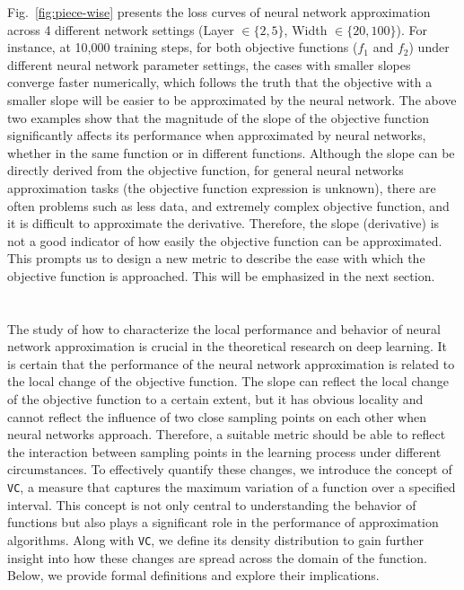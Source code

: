\documentclass[final]{siamart220329}
\newtheorem{theoretical insights}{Theoretical insights}
\newtheorem{practical takeaway}{Practical takeaway}
\begin{document}
Fig.~\ref{fig:piece-wise} presents the loss curves of neural network approximation across 4 different network settings (Layer $\in\{2,5\}$, Width $\in\{20,100\}$). For instance, at 10,000 training steps, for both objective functions ($f_1$ and $f_2$) under different neural network parameter settings, the cases with smaller slopes converge faster numerically, which follows the truth that the objective with a smaller slope will be easier to be approximated by the neural network.  
The above two examples show that the magnitude of the slope of the objective function significantly affects its performance when approximated by neural networks, whether in the same function or in different functions. Although the slope can be directly derived from the objective function, for general neural networks approximation tasks (the objective function expression is unknown), there are often problems such as less data, and extremely complex objective function, and it is difficult to approximate the derivative. Therefore, the slope (derivative) is not a good indicator of how easily the objective function can be approximated. This prompts us to design a new metric to describe the ease with which the objective function is approached. This will be emphasized in the next section.


\section{\color{black}{Local measurement of function changes}}\label{sec3}




The study of how to characterize the local performance and behavior of neural network approximation is crucial in the theoretical research on deep learning. It is certain that the performance of the neural network approximation is related to the local change of the objective function. {The slope can reflect the local change of the objective function to a certain extent, but it has obvious locality and cannot reflect the influence of two close sampling points on each other when neural networks approach. Therefore, a suitable metric should be able to reflect the interaction between sampling points in the learning process under different circumstances.} 
To effectively quantify these changes, we introduce the concept of \texttt{VC}, a measure that captures the maximum variation of a function over a specified interval. This concept is not only central to understanding the behavior of functions but also plays a significant role in the performance of approximation algorithms. Along with \texttt{VC}, we define its density distribution to gain further insight into how these changes are spread across the domain of the function. Below, we provide formal definitions and explore their implications.
\end{document}

